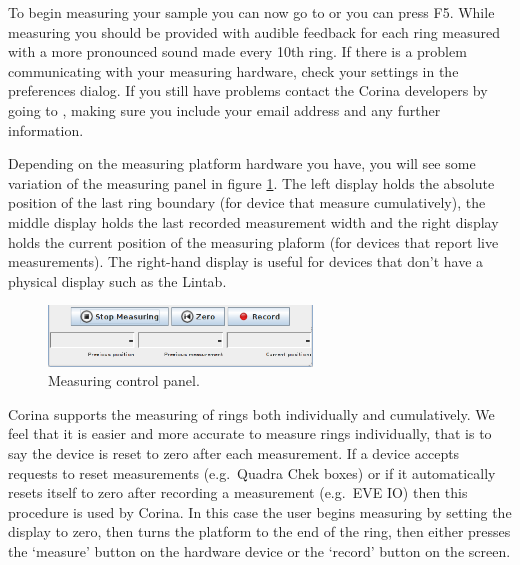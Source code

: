 To begin measuring your sample you can now go to  or you can press F5. While measuring you should be provided with audible feedback for each ring measured with a more pronounced sound made every 10th ring. If there is a problem communicating with your measuring hardware, check your settings in the preferences dialog. If you still have problems contact the Corina developers by going to , making sure you include your email address and any further information.

Depending on the measuring platform hardware you have, you will see some variation of the measuring panel in figure \ref{fig:measurepanel}. The left display holds the absolute position of the last ring boundary (for device that measure cumulatively), the middle display holds the last recorded measurement width and the right display holds the current position of the measuring plaform (for devices that report live measurements).  The right-hand display is useful for devices that don't have a physical display such as the Lintab. 

\begin{figure}
  \begin{center}
    \includegraphics[width=70mm]{Images/measurepanel.png}
  \end{center}
  \caption{Measuring control panel.}
  \label{fig:measurepanel}
\end{figure}


Corina supports the measuring of rings both individually and cumulatively.  We feel that it is easier and more accurate to measure rings individually, that is to say the device is reset to zero after each measurement.  If a device accepts requests to reset measurements (e.g.\ Quadra Chek boxes) or if it automatically resets itself to zero after recording a measurement (e.g.\ EVE IO) then this procedure is used by Corina.  In this case the user begins measuring by setting the display to zero, then turns the platform to the end of the ring, then either presses the `measure' button on the hardware device or the `record' button on the screen.


